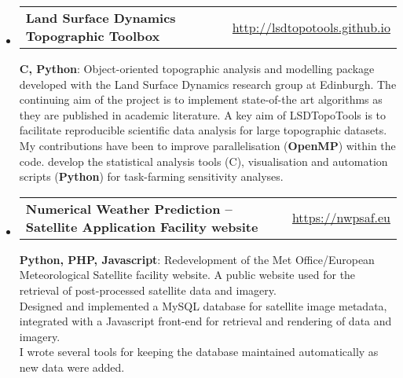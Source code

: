 \documentclass[10.5pt,a4]{article}
\makeatletter
\newcommand{\headerrow}[2]
{\begin{tabular*}{\linewidth}{l@{\extracolsep{\fill}}r}
	#1 &
	#2 \\
\end{tabular*}}
\newcommand{\CPP}
{C\nolinebreak[4]\hspace{-.05em}\raisebox{.22ex}{\footnotesize\bf ++}}
\makeatother
\begin{document}
\begin{itemize}
	\item
	\headerrow
		{\textbf{Land Surface Dynamics Topographic Toolbox}}
		{\url{http://lsdtopotools.github.io}}

		\textbf{{\CPP}, Python}: Object-oriented topographic analysis and modelling package developed with the Land Surface Dynamics research group at Edinburgh. The continuing aim of the project is to implement state-of-the art algorithms as they are published in academic literature. A key aim of LSDTopoTools is to facilitate reproducible scientific data analysis for large topographic datasets. \\
		My contributions have been to improve parallelisation (\textbf{OpenMP}) within the code. develop the statistical analysis tools (\CPP), visualisation and automation scripts (\textbf{Python}) for task-farming sensitivity analyses.
	
	\item
	\headerrow
		{\textbf{Numerical Weather Prediction -- Satellite Application Facility website}}
		{\url{https://nwpsaf.eu}}

		\textbf{Python, PHP, Javascript}: Redevelopment of the Met Office/European Meteorological Satellite facility website. A public website used for the retrieval of post-processed satellite data and imagery. \\
		Designed and implemented a MySQL database for satellite image metadata, integrated with a Javascript front-end for retrieval and rendering of data and imagery. \\
		I wrote several tools for keeping the database maintained automatically as new data were added. 

\end{itemize}
\end{document}
